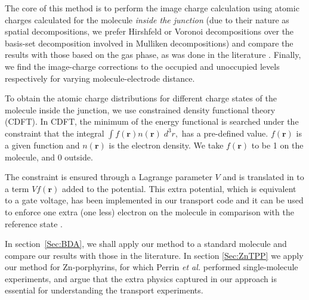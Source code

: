 \documentclass[aip,jcp,a4paper,reprint,floatfix,superscriptaddress]{revtex4-1}
\newcommand{\etal}{\emph{et al.}\xspace}
\newcommand{\bfr}{{\bm r}}
\begin{document}
The core of this method is to perform the image charge calculation using atomic charges calculated for the molecule \emph{inside the junction} (due to their nature as spatial decompositions, we prefer Hirshfeld or Voronoi decompositions over the basis-set decomposition involved in Mulliken decompositions) and compare the results with those based on the gas phase, as was done in the literature \cite{Mowbray2008,Hybertsen1986,Quek2007}.
Finally, we find the image-charge corrections to the occupied and unoccupied levels respectively for varying molecule-electrode distance.

To obtain the atomic charge distributions for different charge states of the molecule inside the junction, we use constrained density functional theory (CDFT). In CDFT, the minimum of the energy functional is searched under the constraint that the integral
$\int f(\bfr) n(\bfr) \; d^3 r,$ has a pre-defined value. $f(\bfr)$ is a given function and $n(\bfr)$ is the electron density. 
We take $f(\bfr)$ to be 1 on the molecule, and 0 outside.

The constraint is ensured through a Lagrange parameter $V$ and is translated in to a term $Vf(\bfr)$ added to the potential. This extra potential, which is equivalent to a gate voltage, has been implemented in our transport code %
and it can %
be used to 
enforce one extra (one less) electron on the molecule in comparison with the reference state%
. 

In section~\ref{Sec:BDA}, we shall apply our method to a standard molecule and compare our results with those in the literature.
In section \ref{Sec:ZnTPP} we apply our method for Zn-porphyrins, for which Perrin \etal performed  single-molecule experiments, and argue that the extra physics captured in %
our approach is essential for understanding the transport experiments.
\end{document}
